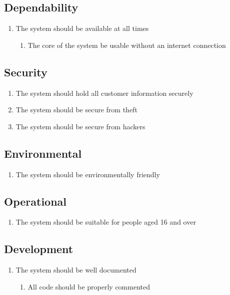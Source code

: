 \documentclass[a4paper]{report}
\begin{document}
\subsection{Dependability}
\label{dependability}
\begin{enumerate}[label=\ref*{dependability}.\arabic*.,leftmargin=*]
\item The system should be available at all times
\begin{enumerate}[label*=\arabic*.]
\item The core of the system be usable without an internet connection
\end{enumerate}
\end{enumerate}
\subsection{Security}
\label{security}
\begin{enumerate}[label=\ref*{security}.\arabic*.,leftmargin=*]
\item The system should hold all customer information securely
\item The system should be secure from theft
\item The system should be secure from hackers
\end{enumerate}
\subsection{Environmental}
\label{environmental}
\begin{enumerate}[label=\ref*{environmental}.\arabic*.,leftmargin=*]
\item The system should be environmentally friendly
\end{enumerate}
\subsection{Operational}
\label{operational}
\begin{enumerate}[label=\ref*{operational}.\arabic*.,leftmargin=*]
\item The system should be suitable for people aged 16 and over
\end{enumerate}
\subsection{Development}
\label{development}
\begin{enumerate}[label=\ref*{development}.\arabic*.,leftmargin=*]
\item The system should be well documented
\begin{enumerate}[label*=\arabic*.]
\item All code should be properly commented
\end{enumerate}
\end{enumerate}
\end{document}
